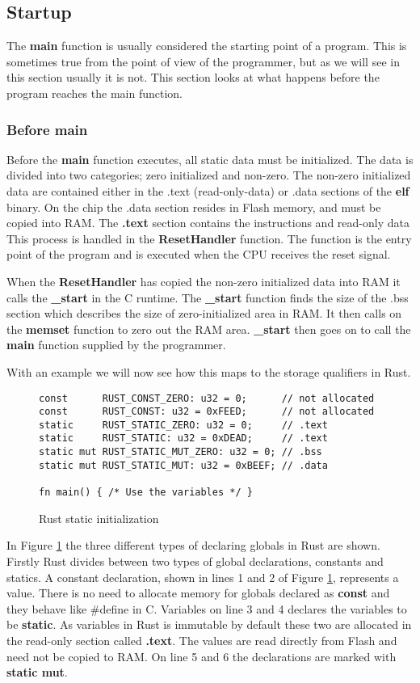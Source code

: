 \subsection{Startup}

The \textbf{main} function is usually considered the starting point of a program.
This is sometimes true from the point of view of the programmer, but as we will see in this section usually it is not.
This section looks at what happens before the program reaches the main function.

\subsubsection{Before main}

Before the \textbf{main} function executes, all static data must be initialized.
The data is divided into two categories; zero initialized and non-zero.
The non-zero initialized data are contained either in the .text (read-only-data) or .data sections of the \textbf{elf} binary.
On the chip the .data section resides in Flash memory, and must be copied into RAM.
The \textbf{.text} section contains the instructions and read-only data 
This process is handled in the \textbf{ResetHandler} function.
The function is the entry point of the program and is executed when the CPU receives the reset signal.

When the \textbf{ResetHandler} has copied the non-zero initialized data into RAM it calls the \textbf{\_start} in the C runtime.
The \textbf{\_start} function finds the size of the .bss section which describes the size of zero-initialized area in RAM.
It then calls on the \textbf{memset} function to zero out the RAM area.
\textbf{\_start} then goes on to call the \textbf{main} function supplied by the programmer.

With an example we will now see how this maps to the storage qualifiers in Rust.
\begin{figure}
\begin{verbatim}
const      RUST_CONST_ZERO: u32 = 0;      // not allocated
const      RUST_CONST: u32 = 0xFEED;      // not allocated
static     RUST_STATIC_ZERO: u32 = 0;     // .text
static     RUST_STATIC: u32 = 0xDEAD;     // .text
static mut RUST_STATIC_MUT_ZERO: u32 = 0; // .bss
static mut RUST_STATIC_MUT: u32 = 0xBEEF; // .data

fn main() { /* Use the variables */ }
\end{verbatim}
\caption{Rust static initialization}
\label{fig:rust-static-init}
\end{figure}
In Figure \ref{fig:rust-static-init} the three different types of declaring globals in Rust are shown.
Firstly Rust divides between two types of global declarations, constants and statics.
A constant declaration, shown in lines 1 and 2 of Figure \ref{fig:rust-static-init}, represents a value.
There is no need to allocate memory for globals declared as \textbf{const} and they behave like #define in C.
Variables on line 3 and 4 declares the variables to be \textbf{static}.
As variables in Rust is immutable by default these two are allocated in the read-only section called \textbf{.text}.
The values are read directly from Flash and need not be copied to RAM.
On line 5 and 6 the declarations are marked with \textbf{static mut}. 
